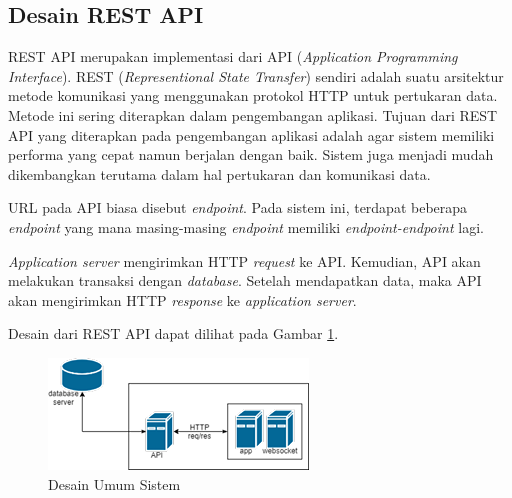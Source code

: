 \subsection{Desain REST API}
REST API merupakan implementasi dari API (\textit{Application Programming Interface}). REST (\textit{Representional State Transfer}) sendiri adalah suatu arsitektur metode komunikasi yang menggunakan protokol HTTP untuk pertukaran data. Metode ini sering diterapkan dalam pengembangan aplikasi. Tujuan dari REST API yang diterapkan pada pengembangan aplikasi adalah agar sistem memiliki performa yang cepat namun berjalan dengan baik. Sistem juga menjadi mudah dikembangkan terutama dalam hal pertukaran dan komunikasi data. 

URL pada API biasa disebut \textit{endpoint}. Pada sistem ini, terdapat beberapa \textit{endpoint} yang mana masing-masing \textit{endpoint} memiliki \textit{endpoint-endpoint} lagi. 

\textit{Application server} mengirimkan HTTP \textit{request} ke API. Kemudian, API akan melakukan transaksi dengan \textit{database}. Setelah mendapatkan data, maka API akan mengirimkan HTTP \textit{response} ke \textit{application server}. 

Desain dari REST API dapat dilihat pada Gambar \ref{fig:api}. 

\begin{figure}[H]
	\centering
	\includegraphics[scale=0.75]{assets/images/rest-api.png}
	\caption{Desain Umum Sistem}
	\label{fig:api}
\end{figure}